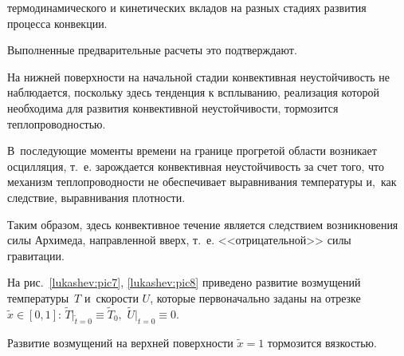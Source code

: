 термодинамического и кинетических вкладов на разных стадиях развития процесса конвекции. 

Выполненные предварительные расчеты это подтверждают.

На нижней поверхности на начальной стадии конвективная неустойчивость не наблюдается, поскольку здесь тенденция к всплыванию, реализация которой необходима для развития конвективной неустойчивости, тормозится теплопроводностью. 

В~последующие моменты времени на границе прогретой области возникает осцилляция, т.~е. зарождается конвективная неустойчивость за счет того, что механизм теплопроводности не обеспечивает выравнивания температуры и,~как следствие, выравнивания плотности. 

Таким образом, здесь конвективное течение является следствием возникновения силы Архимеда, направленной вверх, т.~е. <<отрицательной>> силы гравитации.



На рис.~\ref{lukashev:pic7}, \ref{lukashev:pic8} приведено развитие возмущений температуры~$T$ и~скорости $U$, которые первоначально заданы на отрезке $\widetilde x\in[0,1]$: $\widetilde T\bigr|_{\widetilde t=0}\equiv  \widetilde T_0,$ $ \widetilde U\bigr|_{t=0}\equiv 0$. 

Развитие возмущений на верхней поверхности $\widetilde{x}=1$ тормозится вязкостью.























